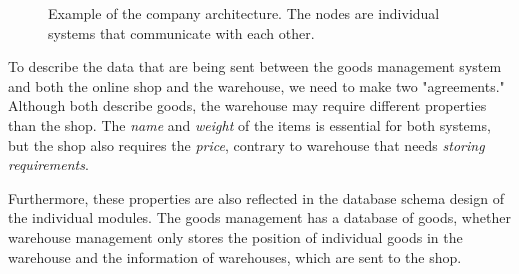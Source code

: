 \begin{figure}[h]\centering
  \caption{Example of the company architecture. The nodes are individual systems that communicate with each other.}
  \label{fig:company-schema}
\end{figure}

To describe the data that are being sent between the goods management system and both the online shop and the warehouse, we need to make two "agreements." Although both describe goods, the warehouse may require different properties than the shop. The \textit{name} and \textit{weight} of the items is essential for both systems, but the shop also requires the \textit{price}, contrary to warehouse that needs \textit{storing requirements}.

Furthermore, these properties are also reflected in the database schema design of the individual modules. The goods management has a database of goods, whether warehouse management only stores the position of individual goods in the warehouse and the information of warehouses, which are sent to the shop.

\medskip

